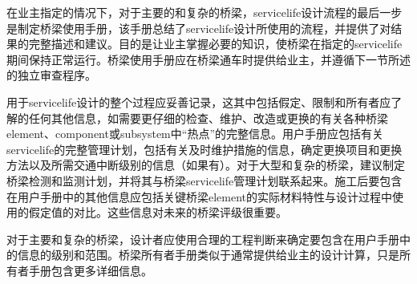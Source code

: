 在业主指定的情况下，对于主要的和复杂的桥梁，\gls{servicelife}设计流程的最后一步是制定桥梁使用手册，该手册总结了\gls{servicelife}设计所使用的流程，并提供了对结果的完整描述和建议。目的是让业主掌握必要的知识，使桥梁在指定的\gls{servicelife}期间保持正常运行。桥梁使用手册应在桥梁通车时提供给业主，并遵循下一节所述的独立审查程序。


用于\gls{servicelife}设计的整个过程应妥善记录，这其中包括假定、限制和所有者应了解的任何其他信息，如需要更仔细的检查、维护、改造或更换的有关各种桥梁\gls{element}、\gls{component}或\gls{subsystem}中“热点”的完整信息。用户手册应包括有关\gls{servicelife}的完整管理计划，包括有关及时维护措施的信息，确定更换项目和更换方法以及所需交通中断级别的信息（如果有）。对于大型和复杂的桥梁，建议制定桥梁检测和监测计划，并将其与桥梁\gls{servicelife}管理计划联系起来。施工后要包含在用户手册中的其他信息应包括关键桥梁\gls{element}的实际材料特性与设计过程中使用的假定值的对比。这些信息对未来的桥梁评级很重要。


对于主要和复杂的桥梁，设计者应使用合理的工程判断来确定要包含在用户手册中的信息的级别和范围。桥梁所有者手册类似于通常提供给业主的设计计算，只是所有者手册包含更多详细信息。

